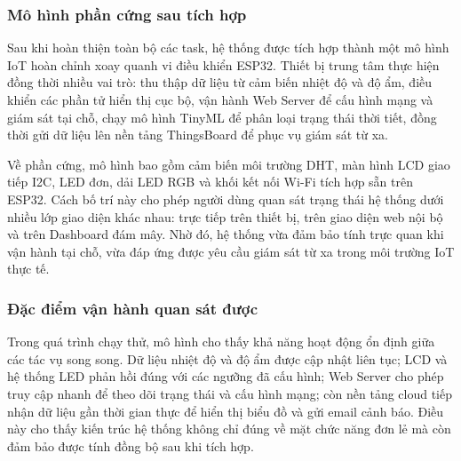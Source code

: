 \subsubsection{Mô hình phần cứng sau tích hợp}
Sau khi hoàn thiện toàn bộ các task, hệ thống được tích hợp thành một mô hình IoT hoàn chỉnh xoay quanh vi điều khiển ESP32. Thiết bị trung tâm thực hiện đồng thời nhiều vai trò: thu thập dữ liệu từ cảm biến nhiệt độ và độ ẩm, điều khiển các phần tử hiển thị cục bộ, vận hành Web Server để cấu hình mạng và giám sát tại chỗ, chạy mô hình TinyML để phân loại trạng thái thời tiết, đồng thời gửi dữ liệu lên nền tảng ThingsBoard để phục vụ giám sát từ xa.

Về phần cứng, mô hình bao gồm cảm biến môi trường DHT, màn hình LCD giao tiếp I2C, LED đơn, dải LED RGB và khối kết nối Wi-Fi tích hợp sẵn trên ESP32. Cách bố trí này cho phép người dùng quan sát trạng thái hệ thống dưới nhiều lớp giao diện khác nhau: trực tiếp trên thiết bị, trên giao diện web nội bộ và trên Dashboard đám mây. Nhờ đó, hệ thống vừa đảm bảo tính trực quan khi vận hành tại chỗ, vừa đáp ứng được yêu cầu giám sát từ xa trong môi trường IoT thực tế.

\subsubsection{Đặc điểm vận hành quan sát được}
Trong quá trình chạy thử, mô hình cho thấy khả năng hoạt động ổn định giữa các tác vụ song song. Dữ liệu nhiệt độ và độ ẩm được cập nhật liên tục; LCD và hệ thống LED phản hồi đúng với các ngưỡng đã cấu hình; Web Server cho phép truy cập nhanh để theo dõi trạng thái và cấu hình mạng; còn nền tảng cloud tiếp nhận dữ liệu gần thời gian thực để hiển thị biểu đồ và gửi email cảnh báo. Điều này cho thấy kiến trúc hệ thống không chỉ đúng về mặt chức năng đơn lẻ mà còn đảm bảo được tính đồng bộ sau khi tích hợp.